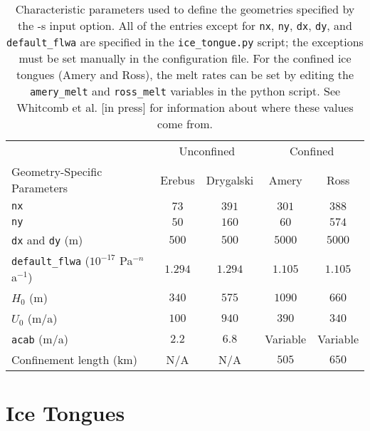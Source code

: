\documentclass{article}
\begin{document}
\begin{table}
   \centering
   \begin{tabular}{l c c c c}
      \toprule
       & \multicolumn{2}{c}{Unconfined} & \multicolumn{2}{c}{Confined} \\
      \cmidrule(lr){2-3}
      \cmidrule(lr){4-5}
      Geometry-Specific Parameters & Erebus & Drygalski & Amery & Ross \\
      \cmidrule(lr){1-1}
      \cmidrule(lr){2-2}
      \cmidrule(lr){3-3}
      \cmidrule(lr){4-4}
      \cmidrule(lr){5-5}
      \texttt{nx} & $73$ & $391$ & $301$ & $388$ \\
      \texttt{ny} & $50$ & $160$ & $60$ & $574$ \\
      \texttt{dx} and \texttt{dy} (m) & $500$ & $500$ & $5000$ & $5000$ \\
      \texttt{default\_flwa} ($10^{-17}$ Pa$^{-n}$ a$^{-1}$) & $1.294$ & $1.294$ & $1.105$ & $1.105$ \\
      $H_0$ (m) & $340$ & $575$ & $1090$ & $660$ \\
      $U_0$ (m/a) & $100$ & $940$ & $390$ & $340$ \\
      \texttt{acab} (m/a) & $2.2$ & $6.8$ & Variable & Variable \\
      Confinement length (km) & N/A & N/A & $505$ & $650$ \\
      \bottomrule
   \end{tabular}
   \caption{Characteristic parameters used to define the geometries specified by the -s input option. All of the entries except for \texttt{nx}, \texttt{ny}, \texttt{dx}, \texttt{dy}, and \texttt{default\_flwa} are specified in the \texttt{ice\_tongue.py} script; the exceptions must be set manually in the configuration file. For the confined ice tongues (Amery and Ross), the melt rates can be set by editing the \texttt{amery\_melt} and \texttt{ross\_melt} variables in the python script. See Whitcomb et al. [in press] for information about where these values come from. }
   \label{table:geometries}
\end{table}

\section{Ice Tongues}
\end{document}
